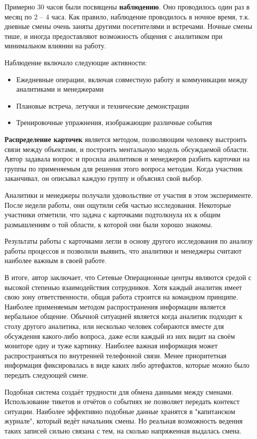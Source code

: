 \documentclass[10pt,a4paper]{article}
\begin{document}
\begin{multicols}{2}
Примерно 30 часов были посвящены \textbf{наблюдению}. Оно проводилось один раз в месяц по 2 -- 4 часа. Как правило, наблюдение проводилось в ночное время, т.к. дневные смены очень заняты другими посетителями и встречами. Ночные смены тише, и иногда предоставляют возможность общения с аналитиком при минимальном влиянии на работу.

Наблюдение включало следующие активности:
\begin{itemize}
\item Ежедневные операции, включая совместную работу и коммуникации между аналитиками и менеджерами
\item Плановые встреча, летучки и технические демонстрации
\item Тренировочные упражнения, изображающие различные события
\end{itemize}

\textbf{Распределение карточек} является методом, позволяющим человеку выстроить связи между объектами, и построить ментальную модель обсуждаемой области. Автор задавала вопрос и просила аналитиков и менеджеров разбить карточки на группы по применяемым для решения этого вопроса методам. Когда участник заканчивал, он описывал каждую группу и объяснял свой выбор.

Аналитики и менеджеры получали удовольствие от участия в этом эксперименте. После недели работы, они ощутили себя частью исследования. Некоторые участники отметили, что задача с карточками подтолкнула их к общим размышлениям о той области, к которой они были хорошо знакомы.

Результаты работы с карточками легли в основу другого исследования по анализу работы процессов и позволили выявить, что аналитики и менеджеры считают наиболее важным в своей работе.

В итоге, автор заключает, что Сетевые Операционные центры являются средой с высокой степенью взаимодействия сотрудников. Хотя каждый аналитик имеет свою зону ответственности, общая работа строится на командном принципе. Наиболее применяемым методом распространения информации является вербальное общение. Обычной ситуацией является когда аналитик подходит к столу другого аналитика, или несколько человек собираются вместе для обсуждения какого-либо вопроса, даже если каждый из них видит на своём мониторе одну и туже картинку. Наиболее важная информация может распространяться по внутренней телефонной связи. Менее приоритетная информация фиксировалась в виде каких либо артефактов, которые можно было передать следующей смене.

Подобная система создаёт трудности для обмена данными между сменами. Использование тикетов и отчётов о событиях не позволяет передать контекст ситуации. Наиболее эффективно подобные данные хранятся в "капитанском журнале", который ведёт начальник смены. Но реальная возможность ведения таких записей сильно связана с тем, на сколько напряженная выдалась смена.


\end{multicols}
\end{document}
